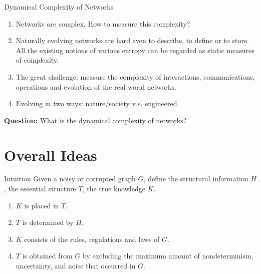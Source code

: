\documentclass[t,aspectratio=169,usepdftitle=false]{beamer}
\begin{document}
  \begin{frame}{Dynamical Complexity of Networks}
    \begin{enumerate}
      \item Networks are complex. How to measure this complexity?
      \item Naturally evolving networks are hard even to describe, to define or to store. All the existing notions of various entropy can be regarded as static measures of complexity.
      \item The great challenge: measure the complexity of interactions, communications, operations and evolution of the real world networks.
      \item Evolving in two ways: nature/society v.s. engineered.
    \end{enumerate}
    \vspace{0.3cm}
    \textbf{Question:} What is the dynamical complexity of networks?
  \end{frame}

\section{Overall Ideas}
  \begin{frame}{Intuition}
    Given a noisy or corrupted graph $G$, define the structural information $H$, the essential structure $T$, the true knowledge $K$.
    \begin{enumerate}
      \item $K$ is placed in $T$.
      \item $T$ is determined by $H$.
      \item $K$ consists of the rules, regulations and laws of $G$.
      \item $T$ is obtained from $G$ by excluding the maximum amount of nondeterminism, uncertainty, and noise that occurred in $G$.
    \end{enumerate}
  \end{frame}
\end{document}
